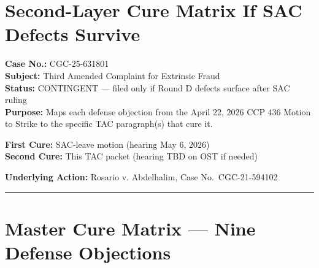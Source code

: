 \section{Second-Layer Cure Matrix If SAC Defects Survive}\label{second-layer-cure-matrix-if-sac-defects-survive}

\textbf{Case No.:} CGC-25-631801\\
\textbf{Subject:} Third Amended Complaint for Extrinsic Fraud\\
\textbf{Status:} CONTINGENT --- filed only if Round D defects surface after SAC ruling\\
\textbf{Purpose:} Maps each defense objection from the April 22, 2026 CCP \textsection{} 436 Motion to Strike to the specific TAC paragraph(s) that cure it.

\textbf{First Cure:} SAC-leave motion (hearing May 6, 2026)\\
\textbf{Second Cure:} This TAC packet (hearing TBD on OST if needed)

\textbf{Underlying Action:} Rosario v. Abdelhalim, Case No.~CGC-21-594102

\begin{center}\rule{0.5\linewidth}{0.5pt}\end{center}

\section{Master Cure Matrix --- Nine Defense Objections}\label{master-cure-matrix-nine-defense-objections}

